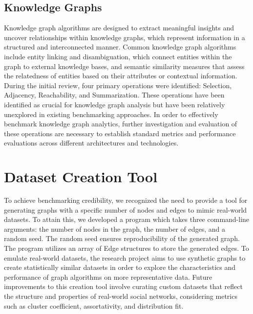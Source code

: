 \documentclass[letterpaper, 10pt]{article}
\begin{document}
\begin{multicols}{2}
        \subsection{Knowledge Graphs}
            Knowledge graph algorithms are designed to extract meaningful insights and uncover relationships within knowledge graphs, which represent information in a structured and interconnected manner. Common knowledge graph algorithms include entity linking and disambiguation, which connect entities within the graph to external knowledge bases, and semantic similarity measures that assess the relatedness of entities based on their attributes or contextual information. During the initial review, four primary operations were identified: Selection, Adjacency, Reachability, and Summarization. These operations have been identified as crucial for knowledge graph analysis but have been relatively unexplored in existing benchmarking approaches. In order to effectively benchmark knowledge graph analytics, further investigation and evaluation of these operations are necessary to establish standard metrics and performance evaluations across different architectures and technologies.
    \section{Dataset Creation Tool}
        To achieve benchmarking credibility, we recognized the need to provide a tool for generating graphs with a specific number of nodes and edges to mimic real-world datasets. To attain this, we developed a program which takes three command-line arguments: the number of nodes in the graph, the number of edges, and a random seed. The random seed ensures reproducibility of the generated graph. The program utilizes an array of Edge structures to store the generated edges. To emulate real-world datasets, the research project aims to use synthetic graphs to create statistically similar datasets in order to explore the characteristics and performance of graph algorithms on more representative data. Future improvements to this creation tool involve curating custom datasets that reflect the structure and properties of real-world social networks, considering metrics such as cluster coefficient, assortativity, and distribution fit. 

\end{multicols}
\end{document}
